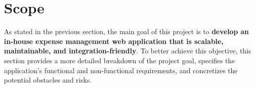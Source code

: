 \section{Scope}
\label{sec:scope}

As stated in the previous section, the main goal of this project is to \textbf{develop an in-house expense management web application that is scalable, maintainable, and integration-friendly}.  To better achieve this objective, this section provides a more detailed breakdown of the project goal, specifies the application's functional and non-functional requirements, and concretizes the potential obstacles and risks.






\newpage